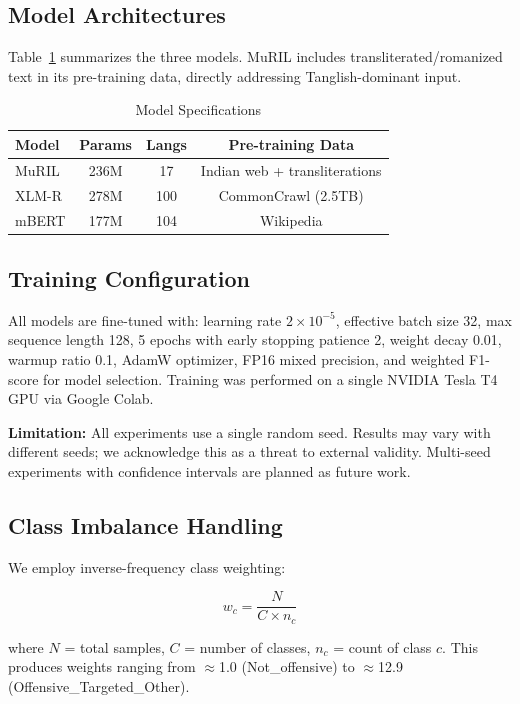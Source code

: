 \documentclass[conference]{IEEEtran}
\begin{document}
\subsection{Model Architectures}

Table~\ref{tab:models} summarizes the three models. MuRIL includes transliterated/romanized text in its pre-training data, directly addressing Tanglish-dominant input.

\begin{table}[!t]
\centering
\caption{Model Specifications}
\label{tab:models}
\begin{tabular}{lccc}
\toprule
\textbf{Model} & \textbf{Params} & \textbf{Langs} & \textbf{Pre-training Data} \\
\midrule
MuRIL & 236M & 17 & Indian web + transliterations \\
XLM-R & 278M & 100 & CommonCrawl (2.5TB) \\
mBERT & 177M & 104 & Wikipedia \\
\bottomrule
\end{tabular}
\end{table}

\subsection{Training Configuration}

All models are fine-tuned with: learning rate $2 \times 10^{-5}$, effective batch size 32, max sequence length 128, 5 epochs with early stopping patience 2, weight decay 0.01, warmup ratio 0.1, AdamW optimizer, FP16 mixed precision, and weighted F1-score for model selection. Training was performed on a single NVIDIA Tesla T4 GPU via Google Colab.

\textbf{Limitation:} All experiments use a single random seed. Results may vary with different seeds; we acknowledge this as a threat to external validity. Multi-seed experiments with confidence intervals are planned as future work.

\subsection{Class Imbalance Handling}

We employ inverse-frequency class weighting:

\begin{equation}
w_c = \frac{N}{C \times n_c}
\end{equation}

where $N$ = total samples, $C$ = number of classes, $n_c$ = count of class $c$. This produces weights ranging from $\approx$1.0 (Not\_offensive) to $\approx$12.9 (Offensive\_Targeted\_Other).
\end{document}
